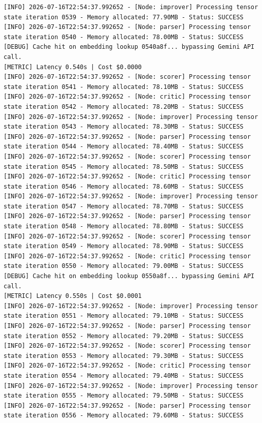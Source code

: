 \documentclass[10pt,journal,compsoc]{IEEEtran}
\begin{document}
\begin{verbatim}
[INFO] 2026-07-16T22:54:37.992652 - [Node: improver] Processing tensor state iteration 0539 - Memory allocated: 77.90MB - Status: SUCCESS
[INFO] 2026-07-16T22:54:37.992652 - [Node: parser] Processing tensor state iteration 0540 - Memory allocated: 78.00MB - Status: SUCCESS
[DEBUG] Cache hit on embedding lookup 0540a8f... bypassing Gemini API call.
[METRIC] Latency 0.540s | Cost $0.0000
[INFO] 2026-07-16T22:54:37.992652 - [Node: scorer] Processing tensor state iteration 0541 - Memory allocated: 78.10MB - Status: SUCCESS
[INFO] 2026-07-16T22:54:37.992652 - [Node: critic] Processing tensor state iteration 0542 - Memory allocated: 78.20MB - Status: SUCCESS
[INFO] 2026-07-16T22:54:37.992652 - [Node: improver] Processing tensor state iteration 0543 - Memory allocated: 78.30MB - Status: SUCCESS
[INFO] 2026-07-16T22:54:37.992652 - [Node: parser] Processing tensor state iteration 0544 - Memory allocated: 78.40MB - Status: SUCCESS
[INFO] 2026-07-16T22:54:37.992652 - [Node: scorer] Processing tensor state iteration 0545 - Memory allocated: 78.50MB - Status: SUCCESS
[INFO] 2026-07-16T22:54:37.992652 - [Node: critic] Processing tensor state iteration 0546 - Memory allocated: 78.60MB - Status: SUCCESS
[INFO] 2026-07-16T22:54:37.992652 - [Node: improver] Processing tensor state iteration 0547 - Memory allocated: 78.70MB - Status: SUCCESS
[INFO] 2026-07-16T22:54:37.992652 - [Node: parser] Processing tensor state iteration 0548 - Memory allocated: 78.80MB - Status: SUCCESS
[INFO] 2026-07-16T22:54:37.992652 - [Node: scorer] Processing tensor state iteration 0549 - Memory allocated: 78.90MB - Status: SUCCESS
[INFO] 2026-07-16T22:54:37.992652 - [Node: critic] Processing tensor state iteration 0550 - Memory allocated: 79.00MB - Status: SUCCESS
[DEBUG] Cache hit on embedding lookup 0550a8f... bypassing Gemini API call.
[METRIC] Latency 0.550s | Cost $0.0001
[INFO] 2026-07-16T22:54:37.992652 - [Node: improver] Processing tensor state iteration 0551 - Memory allocated: 79.10MB - Status: SUCCESS
[INFO] 2026-07-16T22:54:37.992652 - [Node: parser] Processing tensor state iteration 0552 - Memory allocated: 79.20MB - Status: SUCCESS
[INFO] 2026-07-16T22:54:37.992652 - [Node: scorer] Processing tensor state iteration 0553 - Memory allocated: 79.30MB - Status: SUCCESS
[INFO] 2026-07-16T22:54:37.992652 - [Node: critic] Processing tensor state iteration 0554 - Memory allocated: 79.40MB - Status: SUCCESS
[INFO] 2026-07-16T22:54:37.992652 - [Node: improver] Processing tensor state iteration 0555 - Memory allocated: 79.50MB - Status: SUCCESS
[INFO] 2026-07-16T22:54:37.992652 - [Node: parser] Processing tensor state iteration 0556 - Memory allocated: 79.60MB - Status: SUCCESS

\end{verbatim}
\end{document}
